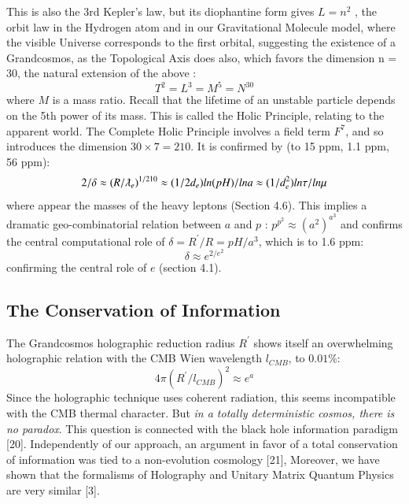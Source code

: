 \documentclass[twoside,draft]{article}
\begin{document}
\begin{sloppypar}
{This is also the 3rd Kepler's law, but its diophantine form gives $L = n^{2}$ , the orbit law in the Hydrogen atom and in our
Gravitational Molecule model, where the visible Universe corresponds to the first orbital,
suggesting the existence of a Grandcosmos, as the Topological Axis does also, which favors the
dimension n = 30, the natural extension of the above :
\begin{equation}
T^{2} = L^{3} = M^{5} = N^{30}
\end{equation}
where $M$ is a mass ratio. Recall that the lifetime of an unstable particle depends on the 5th power of its mass. This is called the Holic Principle, relating to the apparent world. The Complete Holic
Principle involves a field term $F^{7}$, and so introduces the dimension $30 \times 7 = 210$. It is confirmed by (to 15 ppm, 1.1 ppm, 56 ppm):
\begin{equation}
2/\delta \approx (R/\lambdabar_{e})^{1/210} \approx (1/2d_{e}) ln(pH)/lna \approx (1/d_e^{2})ln\tau/ln\mu
\end{equation}
where appear the masses of the heavy leptons (Section 4.6). This implies a dramatic geo-combinatorial relation between $a$ and $p$ : $p^{p^{2}} \approx (a^{2})^{a^{3}}$ and confirms the central computational role of $\delta = R^{\prime}/R = pH/a^{3}$, which is to 1.6 ppm:
\begin{equation}
\delta \approx e^{2/e^2} 
\end{equation}
confirming the central role of $e$ (section 4.1).


\subsection{The Conservation of Information}

The Grandcosmos holographic reduction radius $R^{\prime}$ shows itself an overwhelming holographic
relation with the CMB Wien wavelength $l_{CMB}$, to $0.01\%$:
\begin{equation}
4\pi(R^{\prime}/l_{CMB})^{2} \approx e^{a}
\end{equation}
Since the holographic technique uses coherent radiation, this seems incompatible with the CMB
thermal character. But \textit{in a totally deterministic cosmos, there is no paradox}. This question is
connected with the black hole information paradigm [20]. Independently of our approach, an
argument in favor of a total conservation of information was tied to a non-evolution cosmology
[21], Moreover, we have shown that the formalisms of Holography and Unitary Matrix Quantum
Physics are very similar [3]. 

}
\end{sloppypar}
\end{document}
